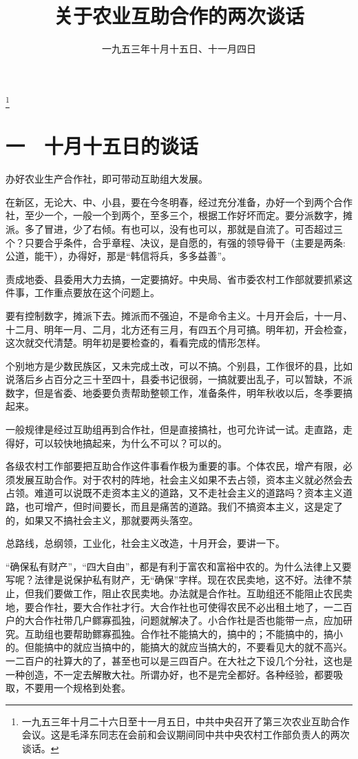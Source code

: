
\title{关于农业互助合作的两次谈话}
\date{一九五三年十月十五日、十一月四日}
\thanks{一九五三年十月二十六日至十一月五日，中共中央召开了第三次农业互助合作会议。这是毛泽东同志在会前和会议期间同中共中央农村工作部负责人的两次谈话。}
\maketitle


\section{一　十月十五日的谈话}

办好农业生产合作社，即可带动互助组大发展。

在新区，无论大、中、小县，要在今冬明春，经过充分准备，办好一个到两个合作社，至少一个，一般一个到两个，至多三个，根据工作好坏而定。要分派数字，摊派。多了冒进，少了右倾。有也可以，没有也可以，那就是自流了。可否超过三个？只要合乎条件，合乎章程、决议，是自愿的，有强的领导骨干（主要是两条:公道，能干），办得好，那是“韩信将兵，多多益善”。

责成地委、县委用大力去搞，一定要搞好。中央局、省市委农村工作部就要抓紧这件事，工作重点要放在这个问题上。

要有控制数字，摊派下去。摊派而不强迫，不是命令主义。十月开会后，十一月、十二月、明年一月、二月，北方还有三月，有四五个月可搞。明年初，开会检查，这次就交代清楚。明年初是要检查的，看看完成的情形怎样。

个别地方是少数民族区，又未完成土改，可以不搞。个别县，工作很坏的县，比如说落后乡占百分之三十至四十，县委书记很弱，一搞就要出乱子，可以暂缺，不派数字，但是省委、地委要负责帮助整顿工作，准备条件，明年秋收以后，冬季要搞起来。

一般规律是经过互助组再到合作社，但是直接搞社，也可允许试一试。走直路，走得好，可以较快地搞起来，为什么不可以？可以的。

各级农村工作部要把互助合作这件事看作极为重要的事。个体农民，增产有限，必须发展互助合作。对于农村的阵地，社会主义如果不去占领，资本主义就必然会去占领。难道可以说既不走资本主义的道路，又不走社会主义的道路吗？资本主义道路，也可增产，但时间要长，而且是痛苦的道路。我们不搞资本主义，这是定了的，如果又不搞社会主义，那就要两头落空。

总路线，总纲领，工业化，社会主义改造，十月开会，要讲一下。

“确保私有财产”，“四大自由”，都是有利于富农和富裕中农的。为什么法律上又要写呢？法律是说保护私有财产，无“确保”字样。现在农民卖地，这不好。法律不禁止，但我们要做工作，阻止农民卖地。办法就是合作社。互助组还不能阻止农民卖地，要合作社，要大合作社才行。大合作社也可使得农民不必出租土地了，一二百户的大合作社带几户鳏寡孤独，问题就解决了。小合作社是否也能带一点，应加研究。互助组也要帮助鳏寡孤独。合作社不能搞大的，搞中的；不能搞中的，搞小的。但能搞中的就应当搞中的，能搞大的就应当搞大的，不要看见大的就不高兴。一二百户的社算大的了，甚至也可以是三四百户。在大社之下设几个分社，这也是一种创造，不一定去解散大社。所谓办好，也不是完全都好。各种经验，都要吸取，不要用一个规格到处套。

